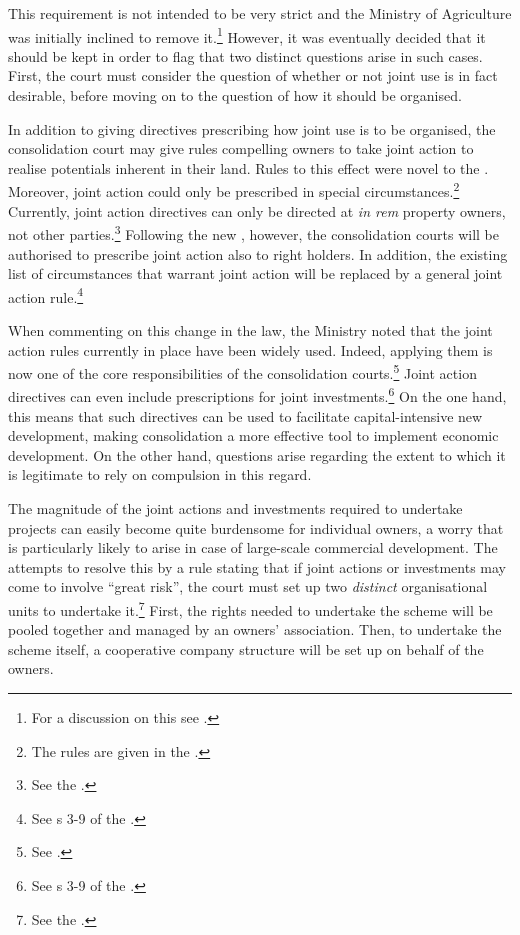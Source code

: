 This requirement is not intended to be very strict and the Ministry of Agriculture was initially inclined to remove it.\footnote{For a discussion on this see \cite[140-141]{prop12}.} However, it was eventually decided that it should be kept in order to flag that two distinct questions arise in such cases. First, the court must consider the question of whether or not joint use is in fact desirable, before moving on to the question of how it should be organised.

In addition to giving directives prescribing how joint use is to be organised, the consolidation court may give rules compelling owners to take joint action to realise potentials inherent in their land. Rules to this effect were novel to the \cite{lca79}. Moreover, joint action could only be prescribed in special circumstances.\footnote{The rules are given in the \cite[2 e)|42-44]{lca79}.} Currently, joint action directives can only be directed at {\it in rem} property owners, not other parties.\footnote{See the \cite[34 a)]{lca79}.} Following the new \cite{lca13}, however, the consolidation courts will be authorised to prescribe joint action also to right holders. In addition, the existing list of circumstances that warrant joint action will be replaced by a general joint action rule.\footnote{See s 3-9 of the \cite{lca13}.}

When commenting on this change in the law, the Ministry noted that the joint action rules currently in place have been widely used. Indeed, applying them is now one of the core responsibilities of the consolidation courts.\footnote{See \cite[146]{prop12}.} Joint action directives can even include prescriptions for joint investments.\footnote{See s 3-9 of the \cite{lca13}.} On the one hand, this means that such directives can be used to facilitate capital-intensive new development, making consolidation a more effective tool to implement economic development. On the other hand, questions arise regarding the extent to which it is legitimate to rely on compulsion in this regard.

The magnitude of the joint actions and investments required to undertake projects can easily become quite burdensome for individual owners, a worry that is particularly likely to arise in case of large-scale commercial development. The \cite{lca79} attempts to resolve this by a rule stating that if joint actions or investments may come to involve ``great risk'', the court must set up two \emph{distinct} organisational units to undertake it.\footnote{See the \cite[34 b)|42]{lca79}.} First, the rights needed to undertake the scheme will be pooled together and managed by an owners' association. Then, to undertake the scheme itself, a cooperative company structure will be set up on behalf of the owners.

